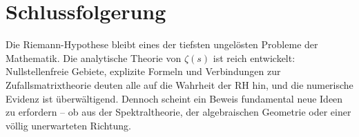 \documentclass[12pt,a4paper]{article}
\theoremstyle{remark}
\begin{document}
\section{Schlussfolgerung}

Die Riemann-Hypothese bleibt eines der tiefsten ungelösten Probleme der Mathematik.
Die analytische Theorie von $\zeta(s)$ ist reich entwickelt: Nullstellenfreie Gebiete,
explizite Formeln und Verbindungen zur Zufallsmatrixtheorie deuten alle auf die
Wahrheit der RH hin, und die numerische Evidenz ist überwältigend.  Dennoch scheint
ein Beweis fundamental neue Ideen zu erfordern – ob aus der Spektraltheorie, der
algebraischen Geometrie oder einer völlig unerwarteten Richtung.
\end{document}
